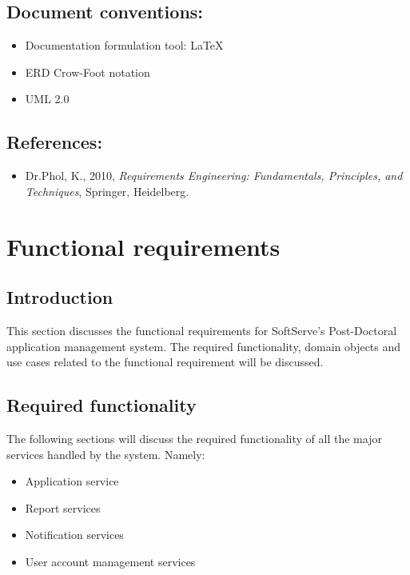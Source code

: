 \documentclass[12pt]{article}
\begin{document}
\vspace{0.5in}

\subsection{Document conventions:}
\vspace{0.1in}
\begin{itemize}
\item Documentation formulation tool: LaTeX
\item ERD Crow-Foot notation
\item UML 2.0
\end{itemize}

\vspace{0.2in}

\subsection{References:}
\vspace{0.1in}
\begin{itemize}
\item Dr.Phol, K., 2010, \textit{Requirements Engineering: Fundamentals, Principles, and Techniques}, Springer, Heidelberg.
\end{itemize}	

\vspace{0.5in}

\newpage
\section{Functional requirements}
\subsection{Introduction} %
\vspace{0.2in}
This section discusses the functional requirements for SoftServe's Post-Doctoral application management system.
The required functionality, domain objects and use cases related to the functional requirement will be discussed.
\vspace{0.2in}

\subsection{Required functionality} %
\vspace{0.2in}
The following sections will discuss the required functionality of all the major services handled by the system. Namely:
\begin{itemize}
\item Application service
\item Report services
\item Notification services
\item User account management services
\end{itemize}
\end{document}
